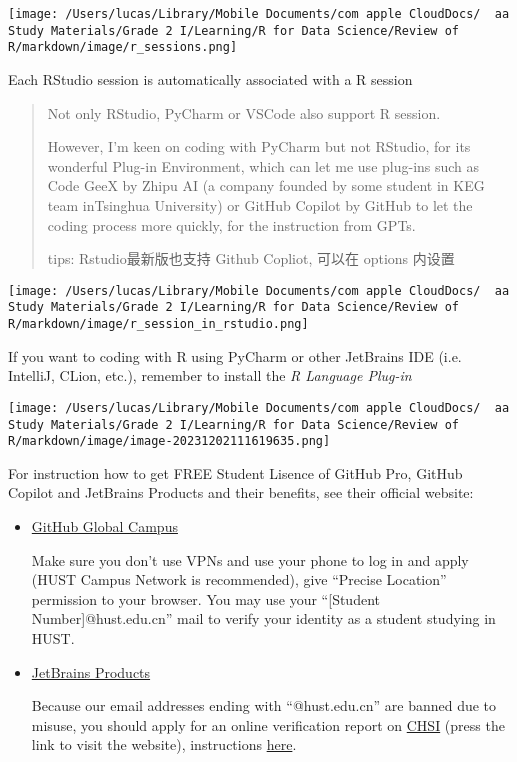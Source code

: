 \documentclass[
]{article}
\let\oldincludegraphics\includegraphics
\renewcommand{\includegraphics}[2][]{\begin{center}\oldincludegraphics[#1]{#2}\end{center}}
\begin{document}
\texttt{[image: /Users/lucas/Library/Mobile Documents/com~apple~CloudDocs/~~aa Study Materials/Grade 2 I/Learning/R for Data Science/Review of R/markdown/image/r\_sessions.png]}

Each RStudio session is automatically associated with a R session

\begin{quote}
Not only RStudio, PyCharm or VSCode also support R session.

However, I'm keen on coding with PyCharm but not RStudio, for its
wonderful Plug-in Environment, which can let me use plug-ins such as
Code GeeX by Zhipu AI (a company founded by some student in KEG team
inTsinghua University) or GitHub Copilot by GitHub to let the coding
process more quickly, for the instruction from GPTs.

tips: Rstudio最新版也支持 Github Copliot, 可以在 options 内设置
\end{quote}

\texttt{[image: /Users/lucas/Library/Mobile Documents/com~apple~CloudDocs/~~aa Study Materials/Grade 2 I/Learning/R for Data Science/Review of R/markdown/image/r\_session\_in\_rstudio.png]}

If you want to coding with R using PyCharm or other JetBrains IDE (i.e.
IntelliJ, CLion, etc.), remember to install the \emph{R Language
Plug-in}

\texttt{[image: /Users/lucas/Library/Mobile Documents/com~apple~CloudDocs/~~aa Study Materials/Grade 2 I/Learning/R for Data Science/Review of R/markdown/image/image-20231202111619635.png]}

For instruction how to get FREE Student Lisence of GitHub Pro, GitHub
Copilot and JetBrains Products and their benefits, see their official
website:

\begin{itemize}
\item
  \href{https://campus.github.com}{GitHub Global Campus}

  Make sure you don't use VPNs and use your phone to log in and apply
  (HUST Campus Network is recommended), give ``Precise Location''
  permission to your browser. You may use your ``{[}Student
  Number{]}@hust.edu.cn'' mail to verify your identity as a student
  studying in HUST.
\item
  \href{https://www.jetbrains.com/lp/leaflets-gdc/students/}{JetBrains
  Products}

  Because our email addresses ending with ``@hust.edu.cn'' are banned
  due to misuse, you should apply for an online verification report on
  \href{chsi.com.cn}{CHSI} (press the link to visit the website),
  instructions \href{https://www.chsi.com.cn/xlcx/rhsq.jsp}{here}.
\end{itemize}
\end{document}
